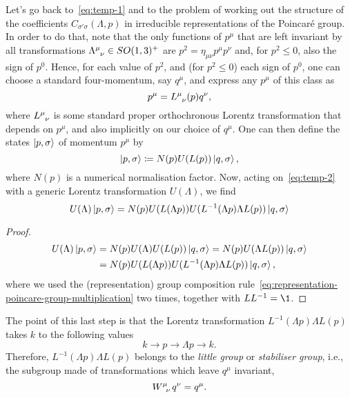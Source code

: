 Let's go back to~\eqref{eq:temp-1} and to the problem of working out the structure of the coefficients $C_{\sigma'\sigma}(\Lambda,p)$ in irreducible representations of the Poincaré group. In order to do that, note that the only functions of $p^\mu$ that are left invariant by all transformations $\tensor{\Lambda}{^\mu_\nu} \in SO(1,3)^+$ are $p^2 = \eta_{\mu\nu} p^\mu p^\nu$ and, for $p^2 \leq 0$, also the sign of $p^0$. Hence, for each value of $p^2$, and (for $p^2 \leq 0$) each sign of $p^0$, one can choose a standard four-momentum, say $q^\mu$, and express any $p^\mu$ of this class as
\begin{equation}
    p^\mu = \tensor{L}{^\mu_\nu}(p)q^\nu,
\end{equation}
where $\tensor{L}{^\mu_\nu}$ is some standard proper orthochronous Lorentz transformation that depends on $p^\mu$, and also implicitly on our choice of $q^\mu$. One can then define the states $\ket{p,\sigma}$ of momentum $p^\mu$ by
\begin{equation}\label{eq:temp-2}
    \ket{p,\sigma} \coloneq N(p) U(L(p)) \ket{q,\sigma},
\end{equation}
where $N(p)$ is a numerical normalisation factor. Now, acting on~\eqref{eq:temp-2} with a generic Lorentz transformation $U(\Lambda)$, we find
\begin{equation}\label{eq:temp-3}
    U(\Lambda) \ket{p,\sigma} = N(p) U(L(\Lambda p)) U(L^{-1}(\Lambda p) \Lambda L(p)) \ket{q,\sigma}
\end{equation}
\begin{proof}
    \begin{equation*}
    \begin{split}
        U(\Lambda) \ket{p,\sigma} &= N(p) U(\Lambda) U(L(p)) \ket{q,\sigma} = N(p) U(\Lambda L(p)) \ket{q,\sigma}\\
         &= N(p) U(L(\Lambda p)) U(L^{-1}(\Lambda p) \Lambda L(p)) \ket{q,\sigma} ,
    \end{split}
    \end{equation*}
    where we used the (representation) group composition rule~\eqref{eq:representation-poincare-group-multiplication} two times, together with $L L^{-1} = \1$.
\end{proof}

 The point of this last step is that the Lorentz transformation $L^{-1}(\Lambda p) \Lambda L(p)$ takes $k$ to the following values
\begin{equation}
    k \to p \to \Lambda p \to k .
\end{equation}
Therefore, $L^{-1}(\Lambda p) \Lambda L(p)$ belongs to the \emph{little  group} or \emph{stabiliser group}, i.e., the subgroup made of transformations which leave $q^\mu$ invariant,
\begin{equation}\label{eq:little-group}
    \tensor{W}{^\mu_\nu} q^\nu = q^\mu .
\end{equation}

